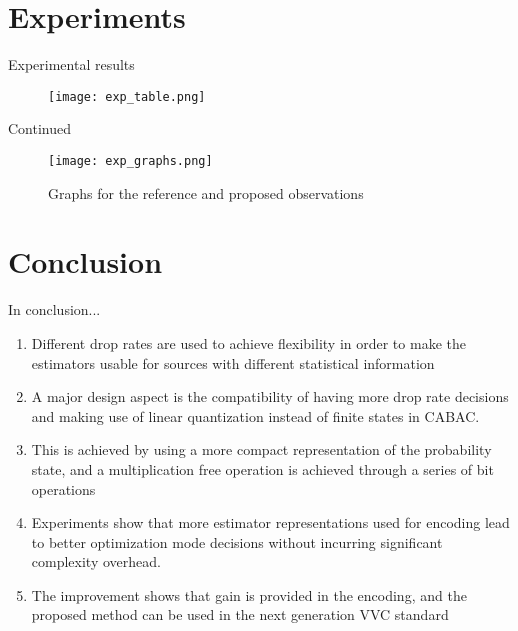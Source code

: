 \documentclass{beamer}
\begin{document}
\section{Experiments}
\begin{frame}{Experimental results}
    \begin{figure}
        \centering
        \texttt{[image: exp\_table.png]}
        \label{fig:my_label}
    \end{figure}
\end{frame}
\begin{frame}{Continued}
    \begin{figure}
        \centering
        \texttt{[image: exp\_graphs.png]}
        \caption{Graphs for the reference and proposed observations}
        \label{fig:exp_g}
    \end{figure}
\end{frame}
\section{Conclusion}
\begin{frame}{In conclusion...}
    \begin{enumerate}
        \item Different drop rates are used to achieve flexibility in order to make the estimators usable for sources with different statistical information
        \item A major design aspect is the compatibility of having more drop rate decisions and making use of linear quantization instead of finite states in CABAC.
        \item This is achieved by using a more compact representation of the probability state, and a multiplication free operation is achieved through a series of bit operations
        \item Experiments show that more estimator representations used for encoding lead to better optimization mode decisions without incurring significant complexity overhead. 
        \item The improvement shows that gain is provided in the encoding, and the proposed method can be used in the next generation VVC standard
    \end{enumerate}
\end{frame}
\end{document}
